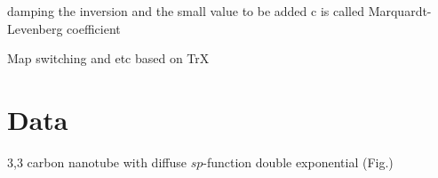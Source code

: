 \documentclass[letterpaper,twocolumn,amsmath,amsfont,amssymb,english,aps,jcp,preprintnumbers,groupaddress,nofootinbib,tightenlines,floatfix]{revtex4}
\theoremstyle{plain}
\theoremstyle{remark}
\theoremstyle{plain}
\begin{document}
damping the inversion and the small value to be added c is called Marquardt-Levenberg coefficient


Map switching and etc based on TrX

\section{Data} \label{data}

3,3 carbon nanotube with diffuse $sp$-function
double exponential (Fig.)







\end{document}
